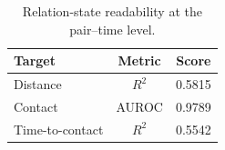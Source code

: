 \begin{table}[t]
\centering
\caption{Relation-state readability at the pair--time level.}
\label{tab:relation-information}
\small
\begin{tabular}{@{}lcc@{}}
\toprule
\textbf{Target} & \textbf{Metric} & \textbf{Score} \\
\midrule
Distance & $R^2$ & 0.5815 \\
Contact & AUROC & 0.9789 \\
Time-to-contact & $R^2$ & 0.5542 \\
\bottomrule
\end{tabular}
\end{table}

